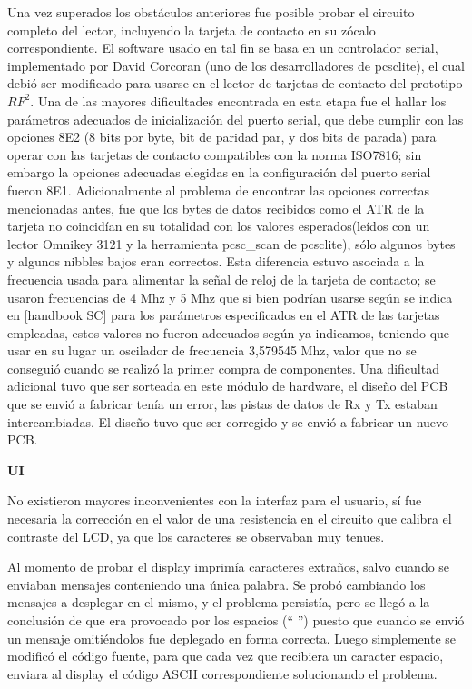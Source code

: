 Una vez superados los obstáculos anteriores fue posible probar el circuito completo del lector, incluyendo 
la tarjeta de contacto en su zócalo correspondiente. El software usado en tal fin se basa en un controlador
serial, implementado por David Corcoran (uno de los desarrolladores de pcsclite), el cual debió ser modificado para usarse en el lector de tarjetas de contacto del prototipo ${RF^{2}}$. Una de las mayores dificultades encontrada en esta etapa fue el hallar los parámetros adecuados de inicialización del puerto serial, que debe cumplir con las opciones 8E2 (8 bits por byte, bit de paridad par, y dos bits de parada) para operar con las tarjetas de contacto compatibles
con la norma ISO7816; sin embargo la opciones adecuadas elegidas en la configuración del puerto serial fueron 8E1.
Adicionalmente al problema de encontrar las opciones correctas mencionadas antes, fue que los bytes de datos
recibidos como el ATR de la tarjeta no coincidían en su totalidad con los valores esperados(leídos con un lector
Omnikey 3121 y la herramienta pcsc\_scan de pcsclite), sólo algunos bytes y algunos nibbles bajos eran correctos.
Esta diferencia estuvo asociada a la frecuencia usada para alimentar la señal de reloj de la tarjeta de contacto;
se usaron frecuencias de 4 Mhz y 5 Mhz que si bien podrían usarse según se indica en [handbook SC] para
los parámetros especificados en el ATR de las tarjetas empleadas, estos valores no fueron adecuados según ya indicamos,
teniendo que usar en su lugar un oscilador de frecuencia 3,579545 Mhz, valor que no se conseguió cuando se realizó
la primer compra de componentes.
Una dificultad adicional tuvo que ser sorteada en este módulo de hardware, el diseño del PCB que se envió a fabricar
tenía un error, las pistas de datos de Rx y Tx estaban intercambiadas. El diseño tuvo que ser corregido y se 
envió a fabricar un nuevo PCB.


\bigskip
\bigskip
{\bf{UI}}


No existieron mayores inconvenientes con la interfaz para el usuario, sí fue 
necesaria la corrección en el valor de una resistencia en el circuito que calibra 
el contraste del LCD, ya que los caracteres se observaban muy tenues.

\bigskip
\bigskip
Al momento de probar el display imprimía caracteres extraños, salvo cuando se enviaban mensajes conteniendo una única palabra. Se probó cambiando los mensajes a desplegar en el mismo, y el problema persistía, pero se llegó a la conclusión de que era provocado por los espacios (“ ”) puesto que cuando se envió un mensaje omitiéndolos fue deplegado en forma correcta. Luego simplemente se 
modificó el código fuente, para que cada vez que recibiera un caracter espacio, enviara al display el código ASCII correspondiente solucionando el problema.

